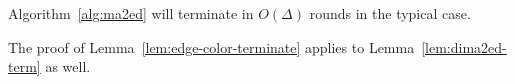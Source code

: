\begin{lem} 
\label{lem:dima2ed-term}
Algorithm~\ref{alg:ma2ed} will terminate in $O(\Delta)$ rounds in the typical case.
\end{lem}

The proof of Lemma~\ref{lem:edge-color-terminate} applies to Lemma~\ref{lem:dima2ed-term} as well.
